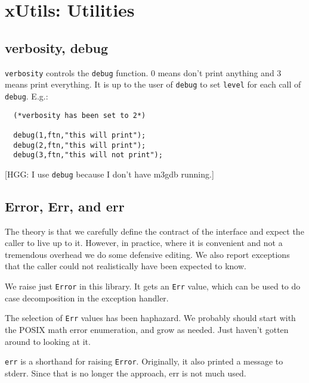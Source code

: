 \section{xUtils: Utilities}

\subsection*{verbosity, debug}
{\tt verbosity} controls the {\tt debug} function.
0 means don't print anything and 3 means print everything.
It is up to the user of {\tt debug} to
set {\tt level} for each call of {\tt debug}.  E.g.:

\begin {tt} \begin{verbatim}
  (*verbosity has been set to 2*)

  debug(1,ftn,"this will print");
  debug(2,ftn,"this will print");
  debug(3,ftn,"this will not print");
\end{verbatim} \end{tt}

[HGG: I use {\tt debug} because I don't have m3gdb running.]

\subsection*{Error, Err, and err}
The theory is that we carefully define the contract of the interface and
expect the caller to live up to it.  However, in practice, where
it is convenient and not a tremendous overhead we do some defensive
editing.  We also report exceptions that the caller could not
realistically have been expected to know.

We raise just {\tt Error} in this library.
It gets an {\tt Err} value, which can be
used to do case decomposition in the exception handler.

The selection of {\tt Err} values has been haphazard.  We probably should
start with the POSIX math error enumeration, and grow as needed.
Just haven't gotten around to looking at it.

{\tt err} is a shorthand for raising {\tt Error}.
Originally, it also printed
a message to stderr. Since that is no longer the approach, err is not
much used.

 
